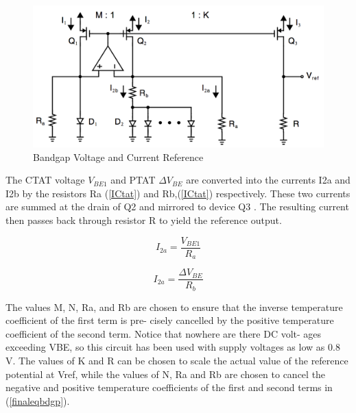\documentclass[11pt,a4paper]{report}
\begin{document}
\begin{figure}[h]
  \begin{center}
    \includegraphics[scale=0.4]{photo/Figure_basique}
  \end{center}
  \caption{Bandgap Voltage and Current Reference}
  \label{bandgap_2pnp}
\end{figure}

The CTAT voltage $V_{BE1}$ and PTAT $\Delta V_{BE}$ are converted into the currents I2a and I2b by the resistors Ra (\ref{ICtat}) and Rb,(\ref{ICtat}) respectively.
These two currents are summed at the drain of Q2 and mirrored to device Q3 . The resulting current then passes back through resistor R to yield the reference output.

\begin{equation}
  I_{2a} = \frac{V_{BE1}}{R_a}
  \label{ICtat}
\end{equation}

\begin{equation}
  I_{2a} = \frac{\Delta V_{BE}}{R_b}
  \label{IPtat}
\end{equation}


The values M, N, Ra, and Rb are chosen to ensure that the inverse temperature coefficient of the first term is pre- cisely cancelled by the positive temperature coefficient of the second term. Notice that nowhere are there DC volt- ages exceeding VBE, so this circuit has been used with supply voltages as low as 0.8 V. The values of K and R can be chosen to scale the actual value of the reference potential at Vref, while the values of N, Ra and Rb are chosen to cancel the negative and positive temperature coefficients of the first and second terms in (\ref{finaleqbdgp}).
\end{document}
